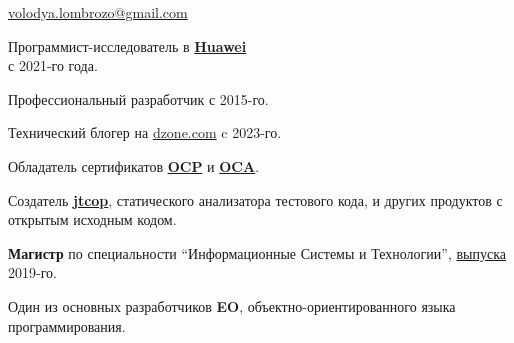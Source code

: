 \documentclass{vl}
\begin{document}
    \vlPrintPhoto{}

    {\bfseries\Large {}}\newline
    \href{mailto:volodya.lombrozo@gmail.com}{volodya.lombrozo@gmail.com}

    \vspace{1em}

    Программист-исследователь в \textbf{\href{https://www.huawei.com}{Huawei}} \\ с 2021-го года.

    Профессиональный разработчик с 2015-го.

    Технический блогер на \href{https://dzone.com/users/4993224/volodya-lombrozo.html}{dzone.com} c 2023-го.

    Обладатель сертификатов
    \textbf{\href{https://catalog-education.oracle.com/pls/certview/sharebadge?id=87F6A2FE819A5A5AF4120A05900AB28A461EE9A3EE9FBFA02721FADAEB3BCE19}{OCP}}%
    и
    \textbf{\href{https://www.credly.com/badges/e2d9ddda-20dc-433d-8ab7-18548fd0fd8f/public_url}{OCA}}.

    Создатель \textbf{\href{https://github.com/volodya-lombrozo/jtcop}{jtcop}}, статического анализатора тестового кода,
    и других продуктов с открытым исходным кодом.


    \textbf{Магистр} по специальности ``Информационные Системы и Технологии'',
    \href{https://en.wikipedia.org/wiki/Saint_Petersburg_Electrotechnical_University}{выпуска} 2019-го.

    Один из основных разработчиков \textbf{EO}, объектно-ориентированного языка программирования.
\end{document}
